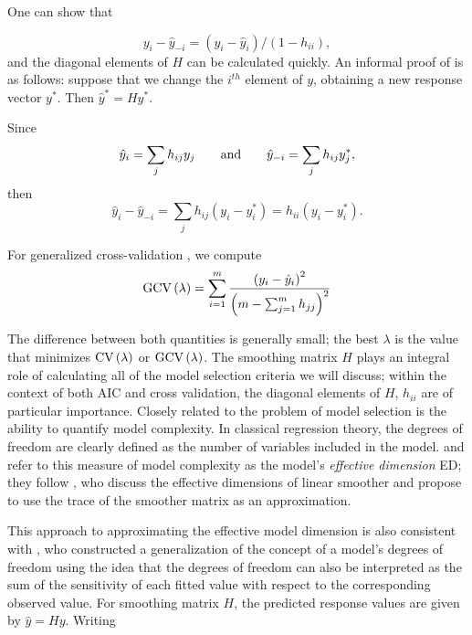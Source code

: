 \documentclass[12pt]{article}
\theoremstyle{definition}
\begin{document}
One can show that 

\begin{equation} \label{eq:LOO_residual}
y_i - \hat{y}_{-i} = \left(y_i - \hat{y}_{i}\right)/\left(1-h_{ii}\right),
\end{equation}
\noindent
and the diagonal elements of $H$ can be calculated quickly. An informal proof of \label{eq:LOO_residual} is as follows: suppose that we change the $i^{th}$ element of $y$, obtaining a new response vector $y^*$. Then $\hat{y}^* = H y^*$.

 Since 
 \[
 \hat{y}_i = \sum_{j} h_{ij} y_j \qquad \textup{and} \qquad \hat{y}_{-i} = \sum_{j} h_{ij} y_j^*,
 \]
 \noindent
 then
 \[
 \hat{y}_i - \hat{y}_{-i} = \sum_j h_{ij} \left(y_i - y_i^*\right) = h_{ii} \left(y_i - y_i^*\right).  
\]


For generalized cross-validation \cite{wahba1990spline}, we compute 
\begin{equation} \label{eq:GCV_def}
\textup{GCV}\left(\lambda\right) = \sum_{i=1}^m \frac{\left(  y_i - \hat{y}_i \right)^2}{\left(m-\sum_{j=1}^m h_{jj}\right)^2} 
\end{equation}

The difference between both quantities is generally small; the best $\lambda$ is the value that minimizes $\textup{CV}\left(\lambda\right)$ or $\textup{GCV}\left(\lambda\right)$. 
The smoothing matrix $H$ plays an integral role of calculating all of the model selection criteria we will discuss; within the context of both AIC and cross validation, the diagonal elements of $H$, $h_{ii}$ are of particular importance. Closely related to the problem of model selection is the ability to quantify model complexity. In classical regression theory, the degrees of freedom are clearly defined as the number of variables included in the model. \cite{eilers1996flexible} and\cite{marx2005multidimensional} refer to this measure of model complexity as the model's \emph{effective dimension} ED; they follow \cite{hastie1990generalized}, who discuss the effective dimensions of linear smoother and propose to use the trace of the smoother matrix as an approximation.

This approach to approximating the effective model dimension is also consistent with \cite{ye1998measuring}, who constructed a generalization of the concept of a model's degrees of freedom using the idea that the degrees of freedom can also be interpreted as the sum of the sensitivity of each fitted value with respect to the corresponding observed value.  For smoothing matrix $H$, the predicted response values are given by $\hat{y} = H y$. Writing
\end{document}
